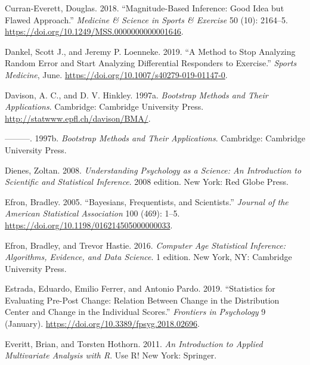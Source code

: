 \documentclass[
]{book}
\newlength{\cslhangindent}
\newenvironment{cslreferences}%
  {\setlength{\parindent}{0pt}%
  \everypar{\setlength{\hangindent}{\cslhangindent}}\ignorespaces}%
  {\par}
\begin{document}
\begin{cslreferences}
\leavevmode\hypertarget{ref-curran-everettMagnitudebasedInferenceGood2018}{}%
Curran-Everett, Douglas. 2018. ``Magnitude-Based Inference: Good Idea but Flawed Approach.'' \emph{Medicine \& Science in Sports \& Exercise} 50 (10): 2164--5. \url{https://doi.org/10.1249/MSS.0000000000001646}.

\leavevmode\hypertarget{ref-dankelMethodStopAnalyzing2019}{}%
Dankel, Scott J., and Jeremy P. Loenneke. 2019. ``A Method to Stop Analyzing Random Error and Start Analyzing Differential Responders to Exercise.'' \emph{Sports Medicine}, June. \url{https://doi.org/10.1007/s40279-019-01147-0}.

\leavevmode\hypertarget{ref-R-boot}{}%
Davison, A. C., and D. V. Hinkley. 1997a. \emph{Bootstrap Methods and Their Applications}. Cambridge: Cambridge University Press. \url{http://statwww.epfl.ch/davison/BMA/}.

\leavevmode\hypertarget{ref-davisonBootstrapMethodsTheir1997}{}%
---------. 1997b. \emph{Bootstrap Methods and Their Applications}. Cambridge: Cambridge University Press.

\leavevmode\hypertarget{ref-dienesUnderstandingPsychologyScience2008}{}%
Dienes, Zoltan. 2008. \emph{Understanding Psychology as a Science: An Introduction to Scientific and Statistical Inference}. 2008 edition. New York: Red Globe Press.

\leavevmode\hypertarget{ref-efronBayesiansFrequentistsScientists2005}{}%
Efron, Bradley. 2005. ``Bayesians, Frequentists, and Scientists.'' \emph{Journal of the American Statistical Association} 100 (469): 1--5. \url{https://doi.org/10.1198/016214505000000033}.

\leavevmode\hypertarget{ref-efronComputerAgeStatistical2016}{}%
Efron, Bradley, and Trevor Hastie. 2016. \emph{Computer Age Statistical Inference: Algorithms, Evidence, and Data Science}. 1 edition. New York, NY: Cambridge University Press.

\leavevmode\hypertarget{ref-estradaStatisticsEvaluatingPrepost2019}{}%
Estrada, Eduardo, Emilio Ferrer, and Antonio Pardo. 2019. ``Statistics for Evaluating Pre-Post Change: Relation Between Change in the Distribution Center and Change in the Individual Scores.'' \emph{Frontiers in Psychology} 9 (January). \url{https://doi.org/10.3389/fpsyg.2018.02696}.

\leavevmode\hypertarget{ref-everittIntroductionAppliedMultivariate2011}{}%
Everitt, Brian, and Torsten Hothorn. 2011. \emph{An Introduction to Applied Multivariate Analysis with R}. Use R! New York: Springer.


\end{cslreferences}
\end{document}

